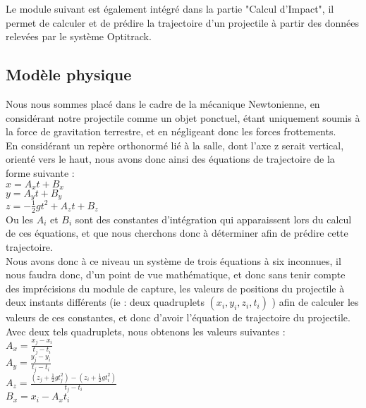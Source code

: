 Le module suivant est également intégré dans la partie "Calcul d'Impact", il permet de calculer et de prédire la trajectoire d'un projectile à partir des données relevées par le système Optitrack.

\subsection{Modèle physique}

Nous nous sommes placé dans le cadre de la mécanique Newtonienne, en considérant notre projectile comme un objet ponctuel, étant uniquement soumis à la force de gravitation terrestre, et en négligeant donc les forces frottements.\\

En considérant un repère orthonormé lié à la salle, dont l'axe z serait vertical, orienté vers le haut, nous avons donc ainsi des équations de trajectoire de la forme suivante :\\

$x = A_xt + B_x$\\

$y = A_yt + B_y$\\

$z = -\frac{1}{2} g t^2 + A_zt + B_z$\\

Ou les $A_i$ et $B_i$ sont des constantes d'intégration qui apparaissent lors du calcul de ces équations, et que nous cherchons donc à déterminer afin de prédire cette trajectoire.\\

Nous avons donc à ce niveau un système de trois équations à six inconnues, il nous faudra donc, d'un point de vue mathématique, et donc sans tenir compte des imprécisions du module de capture, les valeurs de positions du projectile à deux instants différents (ie : deux quadruplets $(x_i, y_i, z_i, t_i)$ ) afin de calculer les valeurs de ces constantes, et donc d'avoir l'équation de trajectoire du projectile.
\newpage
Avec deux tels quadruplets, nous obtenons les valeurs suivantes :\\

$A_x = \frac{x_j-x_i}{t_j-t_i}$\\

$A_y = \frac{y_j-y_i}{t_j-t_i}$\\

$A_z = \frac{(z_j + \frac{1}{2} g t_j^2)-(z_i + \frac{1}{2} g t_i^2)}{t_j-t_i}$\\

$B_x = x_i - A_x t_i$\\

